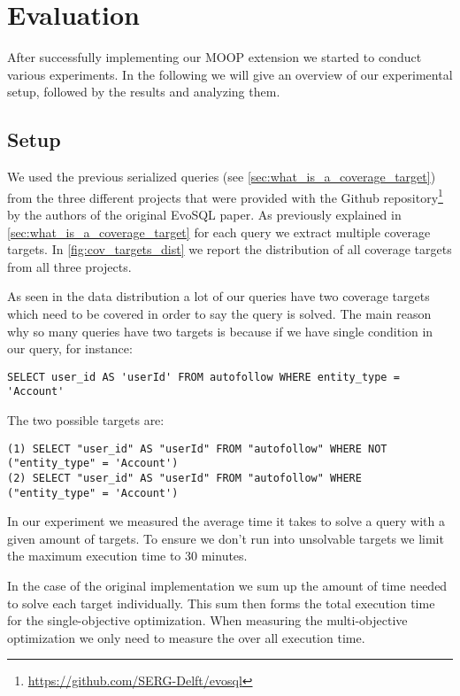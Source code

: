 \chapter{Evaluation}
\label{cha:evaluation}

After successfully implementing our MOOP extension we started to conduct various experiments. In the following we will give an overview of our experimental setup, followed by the results and analyzing them.

\section{Setup}
\label{sec:experimental_setup}
We used the previous serialized queries (see \cref{sec:what_is_a_coverage_target}) from the three different projects that were provided with the Github repository\footnote[2]{\href{https://github.com/SERG-Delft/evosql}{https://github.com/SERG-Delft/evosql}} by the authors of the original EvoSQL paper. As previously explained in \cref{sec:what_is_a_coverage_target} for each query we extract multiple coverage targets. In \cref{fig:cov_targets_dist} we report the distribution of all coverage targets from all three projects.

As seen in the data distribution a lot of our queries have two coverage targets which need to be covered in order to say the query is solved. The main reason why so many queries have two targets is because if we have single condition in our query, for instance:
\begin{verbatim}
SELECT user_id AS 'userId' FROM autofollow WHERE entity_type = 'Account'
\end{verbatim}

The two possible targets are:
\begin{verbatim}
(1) SELECT "user_id" AS "userId" FROM "autofollow" WHERE NOT ("entity_type" = 'Account')
(2) SELECT "user_id" AS "userId" FROM "autofollow" WHERE ("entity_type" = 'Account')
\end{verbatim}

In our experiment we measured the average time it takes to solve a query with a given amount of targets. To ensure we don't run into unsolvable targets we limit the maximum execution time to 30 minutes.

In the case of the original implementation we sum up the amount of time needed to solve each target individually. This sum then forms the total execution time for the single-objective optimization. When measuring the multi-objective optimization we only need to measure the over all execution time.

